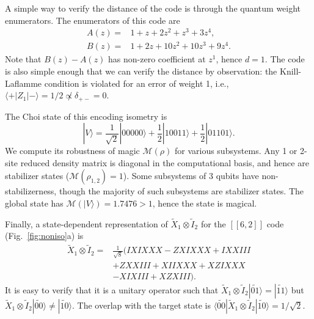 \documentclass[%
 reprint,
superscriptaddress,
nofootinbib,
 amsmath,amssymb,
 aps,
prx,
floatfix,
]{revtex4-2}
\theoremstyle{definition}
\numberwithin{equation}{section}
\begin{document}
A simple way to verify the distance of the code is through the quantum weight enumerators\cite{SL}. The enumerators of this code are 
\begin{align}
    A(z)=&1+z+2z^2+z^3+3z^4,\\
    B(z)=&1+2z+10z^2+10z^3+9z^4.
\end{align}
Note that $B(z)-A(z)$ has non-zero coefficient at $z^1$, hence $d=1$.
The code is also simple enough that we can verify the distance by observation: the Knill-Laflamme condition is violated for an error of weight 1, i.e., $\langle +|Z_1|-\rangle =1/2\not\propto\delta_{+-}=0.$





The Choi state of this encoding isometry is
$$|V\rangle = \frac{1}{\sqrt{2}}|00000\rangle + \frac 1 2 |10011\rangle + \frac 1 2 |01101\rangle.$$
We compute its robustness of magic $\mathcal{M}(\rho)$ \cite{ROM} for various subsystems. Any 1 or 2-site reduced density matrix is diagonal in the computational basis, and hence are stabilizer states ($\mathcal{M}(\rho_{1,2})=1$). Some subsystems of 3 qubits have non-stabilizerness, though the majority of such subsystems are stabilizer states. The global state has $\mathcal{M}(|V\rangle)=1.7476>1$, hence the state is magical. 


Finally, a state-dependent representation of $\tilde{X}_1\otimes\tilde{I}_2$ for the $[[6,2]]$ code (Fig.~\ref{fig:noniso}a) is
\begin{align*}
  \tilde{X}_1\otimes\tilde{I}_2=& \frac{1}{\sqrt{8}}(IXIXXX-ZXIXXX+IXXIII\\
  &+ZXXIII+XIIXXX+XZIXXX\\
  &-XIXIII+XZXIII).  
\end{align*}
It is easy to verify that it is a unitary operator such that $\tilde{X}_1\otimes\tilde{I}_2|\tilde{01}\rangle=|\tilde{11}\rangle$ but $\tilde{X}_1\otimes\tilde{I}_2|\tilde{00}\rangle\ne|\tilde{10}\rangle$. The overlap with the target state is $\langle \tilde{00}|\tilde{X}_1\otimes\tilde{I}_2|\tilde{10}\rangle=1/\sqrt{2}$.
\end{document}
